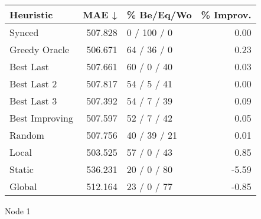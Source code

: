 \begin{tabular}{lrlr}
\toprule
\textbf{Heuristic} & \textbf{MAE ↓} & \textbf{\% Be/Eq/Wo} & \textbf{\% Improv.} \\
\midrule
            Synced &        507.828 &          0 / 100 / 0 &                0.00 \\
     Greedy Oracle &        506.671 &          64 / 36 / 0 &                0.23 \\
         Best Last &        507.661 &          60 / 0 / 40 &                0.03 \\
       Best Last 2 &        507.817 &          54 / 5 / 41 &                0.00 \\
       Best Last 3 &        507.392 &          54 / 7 / 39 &                0.09 \\
    Best Improving &        507.597 &          52 / 7 / 42 &                0.05 \\
            Random &        507.756 &         40 / 39 / 21 &                0.01 \\
             Local &        503.525 &          57 / 0 / 43 &                0.85 \\
            Static &        536.231 &          20 / 0 / 80 &               -5.59 \\
            Global &        512.164 &          23 / 0 / 77 &               -0.85 \\
\bottomrule
\end{tabular}
\caption{Node 1}
\label{tab:iid_lr01_le2_bs4_1}
